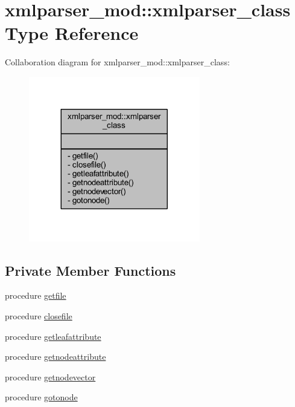 \hypertarget{structxmlparser__mod_1_1xmlparser__class}{}\section{xmlparser\+\_\+mod\+:\+:xmlparser\+\_\+class Type Reference}
\label{structxmlparser__mod_1_1xmlparser__class}


Collaboration diagram for xmlparser\+\_\+mod\+:\+:xmlparser\+\_\+class\+:
\nopagebreak
\begin{figure}[H]
\begin{center}
\leavevmode
\includegraphics[width=212pt]{structxmlparser__mod_1_1xmlparser__class__coll__graph}
\end{center}
\end{figure}
\subsection*{Private Member Functions}
\begin{DoxyCompactItemize}
\item 
procedure \mbox{\hyperlink{structxmlparser__mod_1_1xmlparser__class_a8e0ad8c206828eeefb790224078a66a0}{getfile}}
\item 
procedure \mbox{\hyperlink{structxmlparser__mod_1_1xmlparser__class_a4591b4aad89a5dc75d3e2c0a338b916a}{closefile}}
\item 
procedure \mbox{\hyperlink{structxmlparser__mod_1_1xmlparser__class_a2fef6b1f3d8c3daf38f6d82b87abc4e5}{getleafattribute}}
\item 
procedure \mbox{\hyperlink{structxmlparser__mod_1_1xmlparser__class_a75892404ed305fb3587e02733c8cb19c}{getnodeattribute}}
\item 
procedure \mbox{\hyperlink{structxmlparser__mod_1_1xmlparser__class_ae64ee0cd25265d052136c131bc62edd9}{getnodevector}}
\item 
procedure \mbox{\hyperlink{structxmlparser__mod_1_1xmlparser__class_ab8393d12a17d3409c136cdf29d0463b2}{gotonode}}
\end{DoxyCompactItemize}


